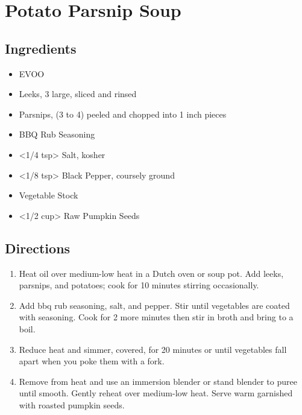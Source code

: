 \section{Potato Parsnip Soup}

\subsection{ Ingredients }

\begin{itemize}
  \item <2 tbs> EVOO
  \item <8 oz> Leeks, 3 large, sliced and rinsed
  \item <1 lb> Parsnips, (3 to 4) peeled and chopped into 1 inch pieces
  \item <2 tbs> BBQ Rub Seasoning
  \item <1/4 tsp> Salt, kosher
  \item <1/8 tsp> Black Pepper, coursely ground
  \item <4 cups> Vegetable Stock
  \item <1/2 cup> Raw Pumpkin Seeds
\end{itemize}

\subsection{ Directions }

\begin{enumerate}
  \item Heat oil over medium-low heat in a Dutch oven or soup pot. Add leeks, parsnips, and potatoes; cook for 10 minutes stirring occasionally. 
  \item Add bbq rub seasoning, salt, and pepper. Stir until vegetables are coated with seasoning. Cook for 2 more minutes then stir in broth and bring to a boil. 
  \item Reduce heat and simmer, covered, for 20 minutes or until vegetables fall apart when you poke them with a fork. 
  \item Remove from heat and use an immersion blender or stand blender to puree until smooth. Gently reheat over medium-low heat. Serve warm garnished with roasted pumpkin seeds. 
\end{enumerate}
